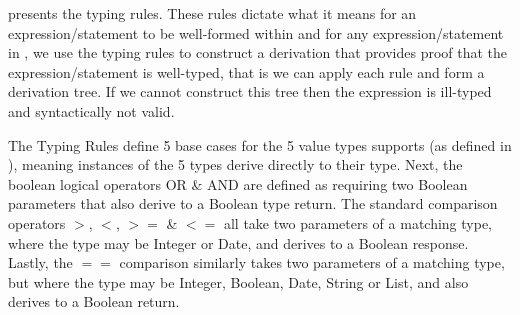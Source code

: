  presents the \thePolicyLang typing rules.
These rules dictate what it means for an expression/statement to be well-formed within \thePolicyLang and for any expression/statement in \thePolicyLang, we use the typing rules to construct a derivation that provides proof that the expression/statement is well-typed, that is we can apply each rule and form a derivation tree. If we cannot construct this tree then the expression is ill-typed and syntactically not valid.

The Typing Rules define 5 base cases for the 5 value types \thePolicyLang supports (as defined in ), meaning instances of the 5 types derive directly to their type. Next, the boolean logical operators OR \& AND are defined as requiring two Boolean parameters that also derive to a Boolean type return. The standard comparison operators \textbf{$>$}, \textbf{$<$}, \textbf{$>=$} \& \textbf{$<=$} all take two parameters of a matching type, where the type may be Integer or Date, and derives to a Boolean response. Lastly, the \textbf{$==$} comparison similarly takes two parameters of a matching type, but where the type may be Integer, Boolean, Date, String or List, and also derives to a Boolean return.
